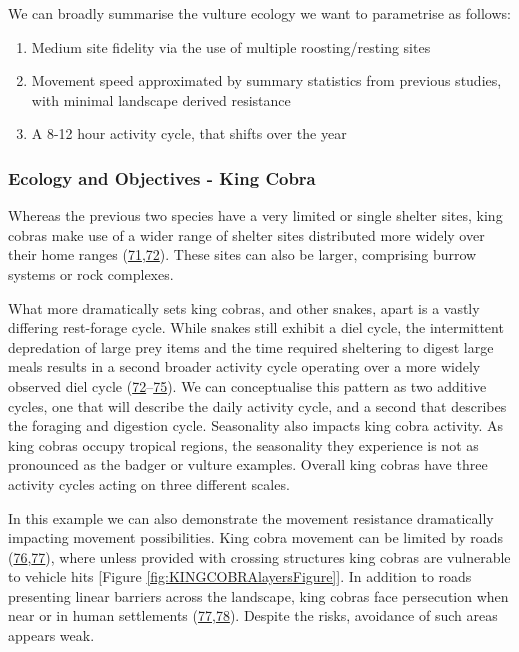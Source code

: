 \documentclass[10pt,a4paper]{article}
\begin{document}
We can broadly summarise the vulture ecology we want to parametrise as follows:

\begin{enumerate}
\def\labelenumi{\arabic{enumi}.}
\item
  Medium site fidelity via the use of multiple roosting/resting sites
\item
  Movement speed approximated by summary statistics from previous studies, with minimal landscape derived resistance
\item
  A 8-12 hour activity cycle, that shifts over the year
\end{enumerate}

\hypertarget{ecology-and-objectives---king-cobra}{%
\subsubsection{Ecology and Objectives - King Cobra}\label{ecology-and-objectives---king-cobra}}

Whereas the previous two species have a very limited or single shelter sites, king cobras make use of a wider range of shelter sites distributed more widely over their home ranges (\protect\hyperlink{ref-Marshall2018}{71},\protect\hyperlink{ref-marshall_no_2020}{72}).
These sites can also be larger, comprising burrow systems or rock complexes.

What more dramatically sets king cobras, and other snakes, apart is a vastly differing rest-forage cycle.
While snakes still exhibit a diel cycle, the intermittent depredation of large prey items and the time required sheltering to digest large meals results in a second broader activity cycle operating over a more widely observed diel cycle (\protect\hyperlink{ref-marshall_no_2020}{72}--\protect\hyperlink{ref-Siers2018}{75}).
We can conceptualise this pattern as two additive cycles, one that will describe the daily activity cycle, and a second that describes the foraging and digestion cycle.
Seasonality also impacts king cobra activity.
As king cobras occupy tropical regions, the seasonality they experience is not as pronounced as the badger or vulture examples.
Overall king cobras have three activity cycles acting on three different scales.

In this example we can also demonstrate the movement resistance dramatically impacting movement possibilities.
King cobra movement can be limited by roads (\protect\hyperlink{ref-jones_how_2022}{76},\protect\hyperlink{ref-Marshall2018b}{77}), where unless provided with crossing structures king cobras are vulnerable to vehicle hits {[}Figure \ref{fig:KINGCOBRAlayersFigure}{]}.
In addition to roads presenting linear barriers across the landscape, king cobras face persecution when near or in human settlements (\protect\hyperlink{ref-Marshall2018b}{77},\protect\hyperlink{ref-Shankar2013}{78}).
Despite the risks, avoidance of such areas appears weak.
\end{document}
